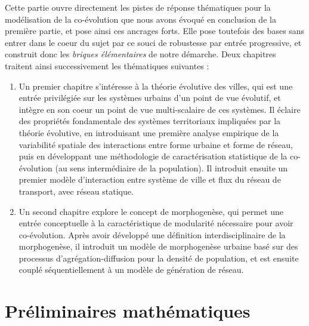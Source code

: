 
Cette partie ouvre directement les pistes de réponse thématiques pour la modélisation de la co-évolution que nous avons évoqué en conclusion de la première partie, et pose ainsi ces ancrages forts. Elle pose toutefois des bases sans entrer dans le coeur du sujet par ce souci de robustesse par entrée progressive, et construit donc les \emph{briques élémentaires} de notre démarche. Deux chapitres traitent ainsi successivement les thématiques suivantes :
\begin{enumerate}
	\item Un premier chapitre s'intéresse à la théorie évolutive des villes, qui est une entrée privilégiée sur les systèmes urbains d'un point de vue évolutif, et intègre en son coeur un point de vue multi-scalaire de ces systèmes. Il éclaire des propriétés fondamentale des systèmes territoriaux impliquées par la théorie évolutive, en introduisant une première analyse empirique de la variabilité spatiale des interactions entre forme urbaine et forme de réseau, puis en développant une méthodologie de caractérisation statistique de la co-évolution (au sens intermédiaire de la population). Il introduit ensuite un premier modèle d'interaction entre système de ville et flux du réseau de transport, avec réseau statique.
	\item Un second chapitre explore le concept de morphogenèse, qui permet une entrée conceptuelle à la caractéristique de modularité nécessaire pour avoir co-évolution. Après avoir développé une définition interdisciplinaire de la morphogenèse, il introduit un modèle de morphogenèse urbaine basé sur des processus d'agrégation-diffusion pour la densité de population, et est ensuite couplé séquentiellement à un modèle de génération de réseau.
\end{enumerate}







\stars







\chapter*{Préliminaires mathématiques}


